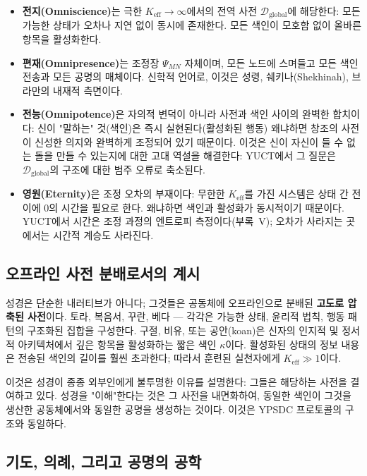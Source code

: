 \documentclass[12pt,a4paper]{article}
\begin{document}
	\begin{itemize}[leftmargin=*]
		\item \textbf{전지(Omniscience)}는 극한 \(K_{\mathrm{eff}} \to \infty\)에서의 전역 사전 \(\mathcal{D}_{\text{global}}\)에 해당한다: 모든 가능한 상태가 오차나 지연 없이 동시에 존재한다. 모든 색인이 모호함 없이 올바른 항목을 활성화한다.
		\item \textbf{편재(Omnipresence)}는 조정장 \(\Psi_{MN}\) 자체이며, 모든 노드에 스며들고 모든 색인 전송과 모든 공명의 매체이다. 신학적 언어로, 이것은 성령, 쉐키나(Shekhinah), 브라만의 내재적 측면이다.
		\item \textbf{전능(Omnipotence)}은 자의적 변덕이 아니라 사전과 색인 사이의 완벽한 합치이다: 신이 "말하는" 것(색인)은 즉시 실현된다(활성화된 행동) 왜냐하면 창조의 사전이 신성한 의지와 완벽하게 조정되어 있기 때문이다. 이것은 신이 자신이 들 수 없는 돌을 만들 수 있는지에 대한 고대 역설을 해결한다: YUCT에서 그 질문은 \(\mathcal{D}_{\text{global}}\)의 구조에 대한 범주 오류로 축소된다.
		\item \textbf{영원(Eternity)}은 조정 오차의 부재이다: 무한한 \(K_{\mathrm{eff}}\)를 가진 시스템은 상태 간 전이에 0의 시간을 필요로 한다. 왜냐하면 색인과 활성화가 동시적이기 때문이다. YUCT에서 시간은 조정 과정의 엔트로피 측정이다(부록~V); 오차가 사라지는 곳에서는 시간적 계승도 사라진다.
	\end{itemize}
	
	\subsection{오프라인 사전 분배로서의 계시}
	
	성경은 단순한 내러티브가 아니다; 그것들은 공동체에 오프라인으로 분배된 \textbf{고도로 압축된 사전}이다. 토라, 복음서, 꾸란, 베다 — 각각은 가능한 상태, 윤리적 법칙, 행동 패턴의 구조화된 집합을 구성한다. 구절, 비유, 또는 공안(koan)은 신자의 인지적 및 정서적 아키텍처에서 깊은 항목을 활성화하는 짧은 색인 \(\kappa\)이다. 활성화된 상태의 정보 내용은 전송된 색인의 길이를 훨씬 초과한다; 따라서 훈련된 실천자에게 \(K_{\mathrm{eff}} \gg 1\)이다.
	
	이것은 성경이 종종 외부인에게 불투명한 이유를 설명한다: 그들은 해당하는 사전을 결여하고 있다. 성경을 "이해"한다는 것은 그 사전을 내면화하여, 동일한 색인이 그것을 생산한 공동체에서와 동일한 공명을 생성하는 것이다. 이것은 YPSDC 프로토콜의 구조와 동일하다.
	
	\subsection{기도, 의례, 그리고 공명의 공학}
	
\end{document}
